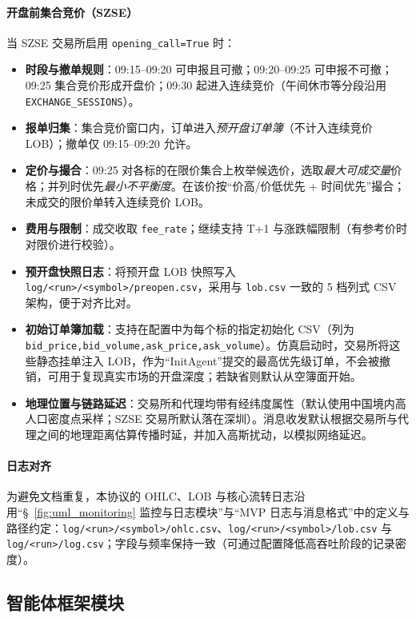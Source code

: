 \paragraph{开盘前集合竞价（SZSE）}
当 SZSE 交易所启用 \verb|opening_call=True| 时：
\begin{itemize}
  \item \textbf{时段与撤单规则}：09:15--09:20 可申报且可撤；09:20--09:25 可申报不可撤；09:25 集合竞价形成开盘价；09:30 起进入连续竞价（午间休市等分段沿用 \verb|EXCHANGE_SESSIONS|）。
  \item \textbf{报单归集}：集合竞价窗口内，订单进入\emph{预开盘订单簿}（不计入连续竞价 LOB）；撤单仅 09:15--09:20 允许。
  \item \textbf{定价与撮合}：09:25 对各标的在限价集合上枚举候选价，选取\emph{最大可成交量}价格；并列时优先\emph{最小不平衡度}。在该价按“价高/价低优先 + 时间优先”撮合；未成交的限价单转入连续竞价 LOB。
  \item \textbf{费用与限制}：成交收取 \verb|fee_rate|；继续支持 T+1 与涨跌幅限制（有参考价时对限价进行校验）。
  \item \textbf{预开盘快照日志}：将预开盘 LOB 快照写入 \verb|log/<run>/<symbol>/preopen.csv|，采用与 \verb|lob.csv| 一致的 5 档列式 CSV 架构，便于对齐比对。
  \item \textbf{初始订单簿加载}：支持在配置中为每个标的指定初始化 CSV（列为 \verb|bid_price,bid_volume,ask_price,ask_volume|）。仿真启动时，交易所将这些静态挂单注入 LOB，作为“InitAgent”提交的最高优先级订单，不会被撤销，可用于复现真实市场的开盘深度；若缺省则默认从空簿面开始。
  \item \textbf{地理位置与链路延迟}：交易所和代理均带有经纬度属性（默认使用中国境内高人口密度点采样；SZSE 交易所默认落在深圳）。消息收发默认根据交易所与代理之间的地理距离估算传播时延，并加入高斯扰动，以模拟网络延迟。
\end{itemize}

\paragraph{日志对齐}
为避免文档重复，本协议的 OHLC、LOB 与核心流转日志沿用“\S~\ref{fig:uml_monitoring} 监控与日志模块”与“MVP 日志与消息格式”中的定义与路径约定：\verb|log/<run>/<symbol>/ohlc.csv|、\verb|log/<run>/<symbol>/lob.csv| 与 \verb|log/<run>/log.csv|；字段与频率保持一致（可通过配置降低高吞吐阶段的记录密度）。

\subsection{智能体框架模块}


